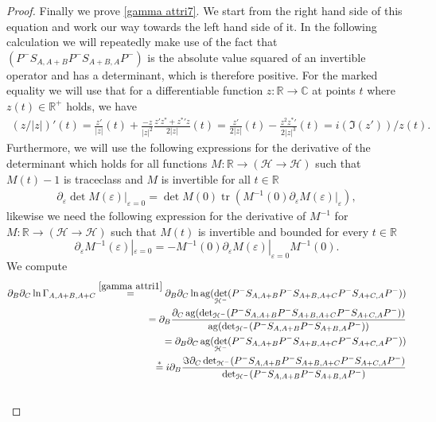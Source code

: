 \documentclass[b5paper,draft,openbib,12pt]{memoir}
\DeclareMathOperator{\tr}{tr}
\DeclareMathOperator{\ag}{ag}
\begin{document}
\begin{proof}
Finally we prove \eqref{gamma attri7}. We start from the right hand side of this equation 
and work our way towards the left hand side of it. In the following calculation we will repeatedly make use of the fact that 
\((P^-S_{A,A+B}P^-S_{A+B,A}P^- )\) is the absolute value squared of an invertible operator and has a determinant, which is therefore positive. 
For the marked equality we will use that for a differentiable function \(z:\mathbb{R}\rightarrow \mathbb{C}\) at points \(t\) where \(z(t)\in\mathbb{R}^+\)
holds, we have
\begin{align}
(z/|z|)'(t)=\frac{z'}{|z|}(t)+\frac{-z}{|z|^2}\frac{z'z^*+ {z^*}'z}{2|z|}(t) =\frac{z'}{2|z|}(t)-\frac{z^2{z^*}'}{2 |z|^3}(t)=i (\Im (z'))/z(t).
\end{align}
Furthermore, we will use the following  expressions for the derivative of the determinant which holds for all functions 
\(M:\mathbb{R}\rightarrow (\mathcal{H}\rightarrow \mathcal{H})\) such that \(M(t)-1\) is traceclass and \(M\) is invertible 
for all \(t\in\mathbb{R}\)
\begin{align}\label{diff det}
\partial_\varepsilon \det M(\varepsilon)|_{\varepsilon=0}=\det M(0) \tr (M^{-1}(0)\partial_\varepsilon M(\varepsilon)|_{\varepsilon}),
\end{align}
likewise we need the following expression for the derivative of \(M^{-1}\) for 
\(M:\mathbb{R}\rightarrow (\mathcal{H}\rightarrow \mathcal{H})\) such that \(M(t)\) is invertible and bounded for every \(t\in\mathbb{R}\)
\begin{equation}
\partial_{\varepsilon}M^{-1}(\varepsilon)|_{\varepsilon=0}=-M^{-1}(0) \partial_{\varepsilon}M(\varepsilon)|_{\varepsilon=0}M^{-1}(0).
\end{equation}
We compute
\begin{align}
\partial_B \partial_C \ln \Gamma_{A,A+B,A+C}
\overset{\eqref{gamma attri1}}{=} 
\partial_B \partial_C \ln \ag(\det_{\mathcal{H}^-} (P^-S_{A,A+B}P^-S_{A+B,A+C}P^- S_{A+C,A}P^-))\\
=\partial_B \frac{\partial_C\ag(\det_{\mathcal{H}^-}(P^-S_{A,A+B}P^-S_{A+B,A+C}P^- S_{A+C,A}P^-))}{\ag(\det_{\mathcal{H}^-} (P^-S_{A,A+B}P^-S_{A+B,A}P^- ))}\\
=\partial_B \partial_C\ag(\det_{\mathcal{H}^-}(P^-S_{A,A+B}P^-S_{A+B,A+C}P^- S_{A+C,A}P^-))\\
\overset{*}{=}
i\partial_B \frac{\Im \partial_C \det_{\mathcal{H}^-}(P^-S_{A,A+B}P^-S_{A+B,A+C}P^- S_{A+C,A}P^-)}{\det_{\mathcal{H}^-}(P^-S_{A,A+B}P^-S_{A+B,A}P^-)}\\\notag

\end{align}
\end{proof}
\end{document}
